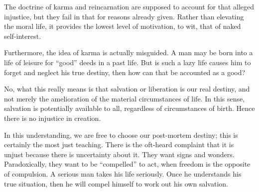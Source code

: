 The doctrine of karma and reincarnation are supposed to account for that alleged injustice, but they fail in that for reasons already given. Rather than elevating the moral life, it provides the lowest level of motivation, to wit, that of naked self-interest.

Furthermore, the idea of karma is actually misguided. A man may be born into a life of leisure for ``good'' deeds in a past life. But is such a lazy life causes him to forget and neglect his true destiny, then how can that be accounted as a good?

No, what this really means is that salvation or liberation is our real destiny, and not merely the amelioration of the material circumstances of life. In this sense, salvation is potentially available to all, regardless of circumstances of birth. Hence there is no injustice in creation.

In this understanding, we are free to choose our post-mortem destiny; this is certainly the most just teaching. There is the oft-heard complaint that it is unjust because there is uncertainty about it. They want signs and wonders. Paradoxically, they want to be ``compelled'' to act, when freedom is the opposite of compulsion. A serious man takes his life seriously. Once he understands his true situation, then he will compel himself to work out his own salvation.



